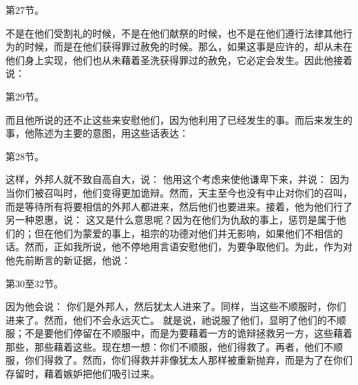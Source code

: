 第27节。  \par

不是在他们受割礼的时候，不是在他们献祭的时候，也不是在他们遵行法律其他行为的时候，而是在他们获得罪过赦免的时候。那么，如果这事是应许的，却从未在他们身上实现，他们也从未藉着圣洗获得罪过的赦免，它必定会发生。因此他接着说：\par

第29节。  \par

而且他所说的还不止这些来安慰他们，因为他利用了已经发生的事。而后来发生的事，他陈述为主要的意图，用这些话表达：\par

第28节。  \par

这样，外邦人就不致自高自大，说：  他用这个考虑来使他谦卑下来，并说：   因为当你们被召叫时，他们变得更加诡辩。然而，天主至今也没有中止对你们的召叫，而是等待所有将要相信的外邦人都进来，然后他们也要进来。接着，他为他们行了另一种恩惠，说：   这又是什么意思呢？因为在他们为仇敌的事上，惩罚是属于他们的；但在他们为蒙爱的事上，祖宗的功德对他们并无影响，如果他们不相信的话。然而，正如我所说，他不停地用言语安慰他们，为要争取他们。为此，作为对他先前断言的新证据，他说：\par

第30至32节。  \par

因为他会说：  你们是外邦人，然后犹太人进来了。同样，当这些不顺服时，你们进来了。然而，他们不会永远灭亡。   就是说，祂说服了他们，显明了他们的不顺服；不是要他们停留在不顺服中，而是为要藉着一方的诡辩拯救另一方，这些藉着那些，那些藉着这些。现在想一想：你们不顺服，他们得救了。再者，他们不顺服，你们得救了。然而，你们得救并非像犹太人那样被重新抛弃，而是为了在你们存留时，藉着嫉妒把他们吸引过来。\par

